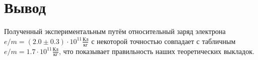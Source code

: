 \documentclass[a4paper,12pt]{article}
\begin{document}
\section{Вывод}
Полученный экспериментальным путём относительный заряд электрона 
$e / m = (2.0 \pm 0.3) \cdot 10^{11} \frac{\text{Кл}}{\text{кг}}$ с некоторой точностью совпадает с табличным $e / m =  1.7 \cdot 10^{11} \frac{\text{Кл}}{\text{кг}}$, что показывает правильность наших теоретических выкладок.

\newpage 

\begin{figure}[h!]
\end{figure}
\begin{figure}[h!]
\end{figure}
\begin{figure}[h!]
\end{figure}
\end{document}
